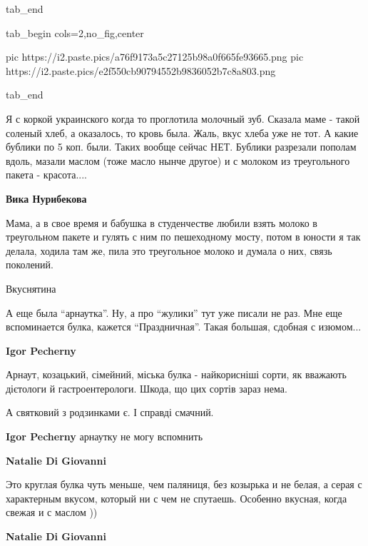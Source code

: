 \begin{itemize}
  tab_end
\fi


\ifcmt
  tab_begin cols=2,no_fig,center

     pic https://i2.paste.pics/a76f9173a5c27125b98a0f665fe93665.png
		 pic https://i2.paste.pics/e2f550cb90794552b9836052b7c8a803.png

  tab_end
\fi


Я с коркой украинского когда то проглотила молочный зуб. Сказала маме - такой
соленый хлеб, а оказалось, то кровь была. Жаль, вкус хлеба уже не тот. А какие
бублики по 5 коп. были. Таких вообще сейчас НЕТ. Бублики разрезали пополам
вдоль, мазали маслом (тоже масло нынче другое) и с молоком из треугольного
пакета - красота....

\begin{itemize} %
\textbf{Вика Нурибекова} 

Мама, а в свое время и бабушка в студенчестве любили взять молоко в треугольном
пакете и гулять с ним по пешеходному мосту, потом в юности я так делала, ходила
там же, пила это треугольное молоко и думала о них, связь поколений.

\end{itemize} %

Вкуснятина


А еще была \enquote{арнаутка}. Ну, а про \enquote{жулики} тут уже писали не раз. Мне еще
вспоминается булка, кажется \enquote{Праздничная}. Такая большая, сдобная с изюмом...

\begin{itemize} %
\textbf{Igor Pecherny}

Арнаут, козацький, сімейний, міська булка - найкорисніші сорти, як вважають
дієтологи й гастроентерологи. Шкода, що цих сортів зараз нема.

А святковий з родзинками є. І справді смачний.


\textbf{Igor Pecherny} арнаутку не могу вспомнить

\begin{itemize} %
\textbf{Natalie Di Giovanni} 

Это круглая булка чуть меньше, чем паляниця, без козырька и не белая, а серая с
характерным вкусом, который ни с чем не спутаешь. Особенно вкусная, когда
свежая и с маслом ))


\textbf{Natalie Di Giovanni}


\end{itemize}
\end{itemize}
\end{itemize}
